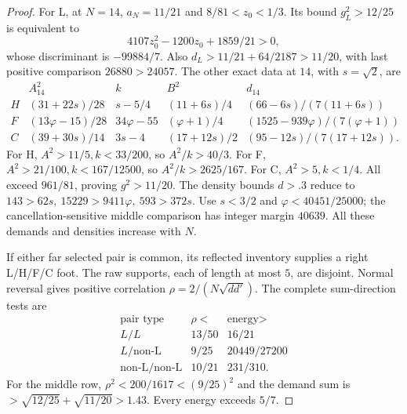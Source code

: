 \documentclass[11pt]{article}
\theoremstyle{definition}
\theoremstyle{remark}
\begin{document}
\begin{proof}
For L, at \(N=14\), \(a_N=11/21\) and
\(8/81<z_0<1/3\). Its bound \(g_L^2>12/25\)
is equivalent to
\[
 4107z_0^2-1200z_0+1859/21>0,
\]
whose discriminant is \(-99884/7\).
Also \(d_L>11/21+64/2187>11/20\), with
last positive comparison \(26880>24057\).
The other exact data at \(14\), with \(s=\sqrt2\), are
\[
\begin{array}{c|c|c|c|c}
 &A_{14}^2&k&B^2&d_{14}\\ \hline
H&(31+22s)/28&s-5/4&(11+6s)/4&
 (66-6s)/(7(11+6s))\\
F&(13\varphi-15)/28&34\varphi-55&(\varphi+1)/4&
 (1525-939\varphi)/(7(\varphi+1))\\
C&(39+30s)/14&3s-4&(17+12s)/2&
 (95-12s)/(7(17+12s)).
\end{array}
\]
For H, \(A^2>11/5,k<33/200\), so \(A^2/k>40/3\).
For F, \(A^2>21/100,k<167/12500\), so
\(A^2/k>2625/167\). For C, \(A^2>5,k<1/4\).
All exceed \(961/81\), proving \(g^2>11/20\).
The density bounds \(d>.3\) reduce to
\(143>62s,\ 15229>9411\varphi,\ 593>372s\).
Use \(s<3/2\) and
\(\varphi<40451/25000\); the cancellation-sensitive
middle comparison has integer margin \(40639\).
All these demands and densities increase with \(N\).

If either far selected pair is common, its reflected
inventory supplies a right L/H/F/C foot.
The raw supports, each of length at most \(5\), are
disjoint. Normal reversal gives positive correlation
\(\rho=2/(N\sqrt{dd'})\).
The complete sum-direction tests are
\[
\begin{array}{c|c|c}
\text{pair type}&\rho<&\text{energy}>\\ \hline
L/L&13/50&16/21\\
L/\text{non-L}&9/25&20449/27200\\
\text{non-L}/\text{non-L}&10/21&231/310.
\end{array}
\]
For the middle row,
\(\rho^2<200/1617<(9/25)^2\) and the demand sum
is \(>\sqrt{12/25}+\sqrt{11/20}>1.43\).
Every energy exceeds \(5/7\).


\end{proof}
\end{document}
